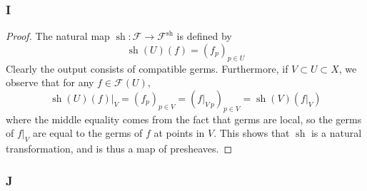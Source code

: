 \documentclass{article}
\newcommand{\fF}{\mathscr{F}}
\DeclareMathOperator{\sh}{sh}
\begin{document}
\subsubsection{I}\label{2.4.I}
\begin{proof}
    The natural map $\sh:\fF\to \fF^{\sh}$ is defined by 
    \[
    \sh(U)(f)=(f_p)_{p\in U}
    \]
    Clearly the output consists of compatible germs. Furthermore, if $V\subset U\subset X$, we observe that for any $f\in \fF(U)$,
    \[
    \sh(U)(f)\vert_{V}=(f_p)_{p\in V}=(f\vert_{V\ p})_{p\in V}=\sh(V)(f\vert_{V})
    \]
    where the middle equality comes from the fact that germs are local, so the germs of $f\vert_V$ are equal to the germs of $f$ at points in $V$. This shows that $\sh$ is a natural transformation, and is thus a map of presheaves.
\end{proof}
\subsubsection{J}\label{2.4.J}
\end{document}

